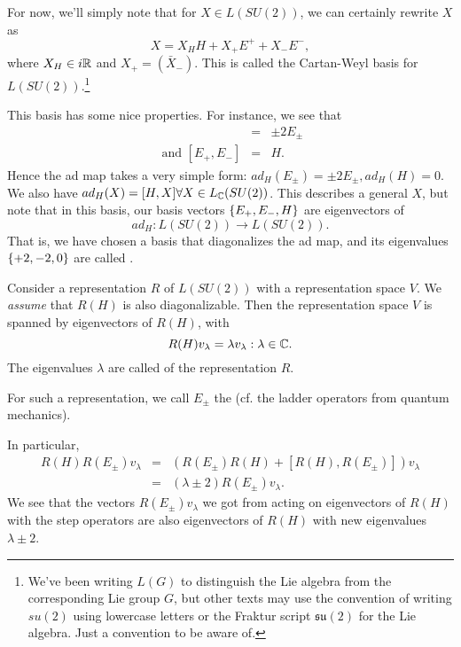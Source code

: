 For now, we'll simply note that for $X\in L(SU(2))$, we can certainly rewrite $X$ as
$$X=X_H H + X_+ E^++ X_- E^-,$$
where $X_H\in i\mathbb{R}$ and $X_+=(\bar X_-).$ This is called the Cartan-Weyl basis for $L(SU(2))$.\footnote{We've been writing $L(G)$ to distinguish the Lie algebra from the corresponding Lie group $G$, but other texts may use the convention of writing $su(2)$ using lowercase letters or the Fraktur script $\mathfrak{su}(2)$ for the Lie algebra. Just a convention to be aware of.}

This basis has some nice properties. For instance, we see that
\begin{eqnarray*}
[H,E_\pm] &=& \pm 2 E_\pm\\
\text{ and } [E_+,E_-] &=& H.
\end{eqnarray*}
Hence the ad map takes a very simple form:
$ad_H(E_\pm)=\pm 2 E_\pm, ad_H(H)=0.$
We also have $ad_H(X)=[H,X]\forall X \in L_{\mathbb{C}}(SU(2))$. This describes a general $X$, but note that in this basis, our basis vectors $\{E_+,E_-,H\}$ are eigenvectors of
$$ad_H:L(SU(2))\to L(SU(2)).$$
That is, we have chosen a basis that diagonalizes the ad map, and its eigenvalues $\{+2,-2,0\}$ are called .

\begin{defn}
Consider a representation $R$ of $L(SU(2))$ with a representation space $V$. We \emph{assume} that $R(H)$ is also diagonalizable. Then the representation space $V$ is spanned by eigenvectors of $R(H)$, with
$$R(H)v_\lambda = \lambda v_\lambda: \lambda \in \mathbb{C}.$$
The eigenvalues $\lambda$ are called  of the representation $R$.
\end{defn}
\begin{defn}
For such a representation, we call $E_\pm$ the  (cf. the ladder operators from quantum mechanics).
\end{defn}
In particular,
\begin{eqnarray*}
R(H)R(E_\pm)v_\lambda &=& (R(E_\pm)R(H) + [R(H),R(E_\pm)]) v_\lambda\\
&=&(\lambda \pm 2) R(E_\pm)v_\lambda.
\end{eqnarray*}
We see that the vectors $R(E_\pm)v_\lambda$ we got from acting on eigenvectors of $R(H)$ with the step operators are also eigenvectors of $R(H)$ with new eigenvalues $\lambda \pm 2$.

